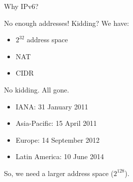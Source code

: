 \begin{frame}{Why IPv6?}
  \begin{iblock}{No enough addresses!}
    Kidding? We have:
    \begin{itemize}
    \item $2^{32}$ address space
    \item NAT
    \item CIDR
    \end{itemize}
    No kidding. All gone.
    \begin{itemize}
    \item IANA: 31 January 2011
    \item Asia-Pacific: 15 April 2011
    \item Europe: 14 September 2012
    \item Latin America: 10 June 2014
    \end{itemize}
  \end{iblock}
  So, we need a larger address space ($2^{128}$).
\end{frame}

